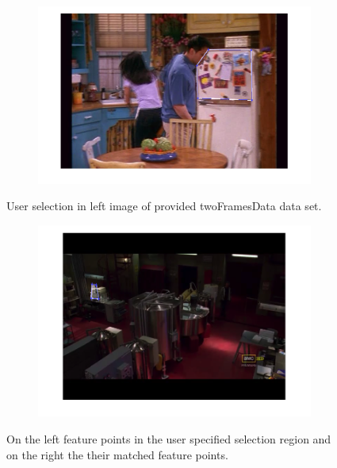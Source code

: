 \documentclass{paper}
\begin{document}
\begin{figure}[H]
\centering
\begin{subfigure}{1.0\textwidth}
\includegraphics[width=\textwidth]{figures/raw_matches/friends/friendsSelection}
\end{subfigure}
\caption{User selection in left image of provided twoFramesData data set.}
\label{fig:friends_raw_sel}
\end{figure}

\begin{figure}[H]
\centering
\begin{subfigure}{1.0\textwidth}
\includegraphics[width=\textwidth]{figures/raw_matches/bb/breakingBadRawSelection_1}
\end{subfigure}
\caption{On the left feature points in the user specified selection region and on the right the their matched feature points.}
\label{fig:bb_raw_matching}
\end{figure}
\end{document}
